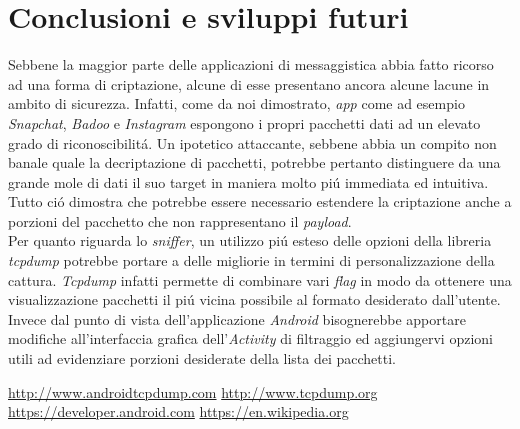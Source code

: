 \documentclass[12pt]{article} %
\begin{document}
\section{Conclusioni e sviluppi futuri} %
Sebbene la maggior parte delle applicazioni di messaggistica abbia fatto ricorso ad una forma di criptazione, alcune di esse presentano ancora alcune lacune in ambito di sicurezza. Infatti, come da noi dimostrato, \textit{app} come ad esempio \textit{Snapchat}, \textit{Badoo} e \textit{Instagram} espongono i propri pacchetti dati ad un elevato grado di riconoscibilit\'a. Un ipotetico attaccante, sebbene abbia un compito non banale quale la decriptazione di pacchetti, potrebbe pertanto distinguere da una grande mole di dati il suo target in maniera molto pi\'u immediata ed intuitiva. Tutto ci\'o dimostra che potrebbe essere necessario estendere la criptazione anche a porzioni del pacchetto che non rappresentano il \textit{payload}.\\
Per quanto riguarda lo \textit{sniffer}, un utilizzo pi\'u esteso delle opzioni della libreria \textit{tcpdump} potrebbe portare a delle migliorie in termini di personalizzazione della cattura. \textit{Tcpdump} infatti permette di combinare vari \textit{flag} in modo da ottenere una visualizzazione pacchetti il pi\'u vicina possibile al formato desiderato dall'utente. Invece dal punto di vista dell'applicazione \textit{Android} bisognerebbe apportare modifiche all'interfaccia grafica dell'\textit{Activity} di filtraggio ed aggiungervi opzioni utili ad evidenziare porzioni desiderate della lista dei pacchetti.



\newpage

\begin{thebibliography}{99}
 \url{http://www.androidtcpdump.com}
 \url{http://www.tcpdump.org}
 \url{https://developer.android.com}
 \url{https://en.wikipedia.org}
\end{thebibliography}
\end{document}
